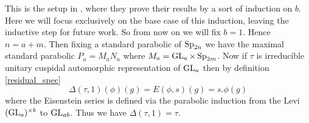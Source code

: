 This is the setup in \cite{jiangPolesCertainResidual2013}, where they prove their results by a sort of induction on \(b\). Here we will focus exclusively on the base case of this induction, leaving the inductive step for future work. So from now on we will fix \(b = 1\). Hence \(n = a + m\). Then fixing a standard parabolic of \(\operatorname{Sp}_{2n}\) we have the maximal standard parabolic \(P_a = M_aN_a\) where \(M_a = \operatorname{GL}_a \times \operatorname{Sp}_{2m}\).  Now if \(\tau\) is irreducible unitary cuspidal automorphic representation of \(\operatorname{GL}_a\) then by definition \ref{residual_spec}
\[\Delta(\tau, 1)(\phi)(g) = E(\phi,s)(g) = s.\phi(g)\]
where the Eisenstein series is defined via the parabolic induction from the Levi \((\operatorname{GL}_a)^{\times b} \) to \(\operatorname{GL}_{ab}\). Thus we have \(\Delta(\tau, 1) = \tau\).


\begin{comment}
    \section{Our Results}
We consider an almost identical setup but we deal with the metaplectic cover of \(\Sp_{2n}\), again over a number field \(F\), \(\Mp_{2n}\)\todo[inline]{reference the section I discuss this in.}. We again fix the Borel of upper triangular matricies, consider partitions of \(n = r+m\) and look at maximal standard parabolics of \(\Sp_{2n}\), \(P_r = M_rN_r\) such that 
\[M_r = \GL_r \times \Sp_{2m}\]
then if \(r = ab\) we still have that \(\Delta(\tau, b)\tensor \sigma\), for \(\tau\) irreducible unitary cuspidal automorphic representation of \(\GL_a\) and \(\sigma\) irreducible generic cuspidal automorphic representation of \(\Sp_{2m}\), is a representation of \(M_r\). The difference is in the parabolic induction as we now consider 
\[\phi\in \mathcal{A}(N_r(\A)M_r(F)\setminus \Mp_{2n}(\A) )_{\Delta(\tau, b)\tensor \sigma}\] 
and then the Eisenstein series is defined in the same way
\[E(\phi, s)(g) = \sum_{\gamma\in P_r(F) \setminus \Sp_{2n}(F)} s.\phi(\gamma g)\]
for \(g\in \Sp_{2n}(F) \setminus \Mp_{2n}(\A)\) and \(s\in \C \cong X^{\Mp_{2n}}_{M_r}\).

\begin{Lemma}
When \(b = 1\) we have the constant term
    \[E(\phi,s)(g)_{P_a} = \phi(g)_{P_a} + M(\omega, \tau\tensor\sigma)(\phi)(g)\]
\end{Lemma}

\todo[inline]{fill in here as theorems or whatever anything that I end up actually checking....}

\end{comment}



